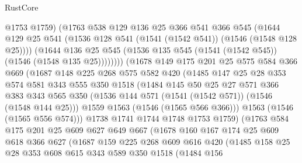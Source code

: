 \begin{lexlean}{RustCore}
\begin{coremodule}
                  @1753
                  @1759)
                (@1763
                  @538
                  @129
                  @136
                  @25
                  @366
                  @541
                  @366
                  @545
                  (@1644
                    @129
                    @25
                    @541
                    (@1536 @128 @541 (@1541 (@1542 @541)) (@1546 (@1548 @128 @25))))
                  (@1644
                    @136
                    @25
                    @545
                    (@1536 @135 @545 (@1541 (@1542 @545)) (@1546 (@1548 @135 @25))))))))
          (@1678
            @149
            @175
            @201
            @25
            @575
            @584
            @366
            @669
            (@1687
              @148
              @225
              @268
              @575
              @582
              @420
              (@1485
                @147
                @25
                @28
                @353
                @574
                @581
                @343
                @555
                @350
                @1518
                (@1484
                  @145
                  @50
                  @25
                  @27
                  @571
                  @366
                  @383
                  @343
                  @565
                  @350
                  (@1536 @144 @571 (@1541 (@1542 @571)) (@1546 (@1548 @144 @25)))
                  @1559
                  @1563
                  (@1546 (@1565 @566 @366)))
                @1563
                (@1546 (@1565 @556 @574)))
              @1738
              @1741
              @1744
              @1748
              @1753
              @1759)
            (@1763
              @584
              @175
              @201
              @25
              @609
              @627
              @649
              @667
              (@1678
                @160
                @167
                @174
                @25
                @609
                @618
                @366
                @627
                (@1687
                  @159
                  @225
                  @268
                  @609
                  @616
                  @420
                  (@1485
                    @158
                    @25
                    @28
                    @353
                    @608
                    @615
                    @343
                    @589
                    @350
                    @1518
                    (@1484
                      @156

\end{coremodule}
\end{lexlean}
